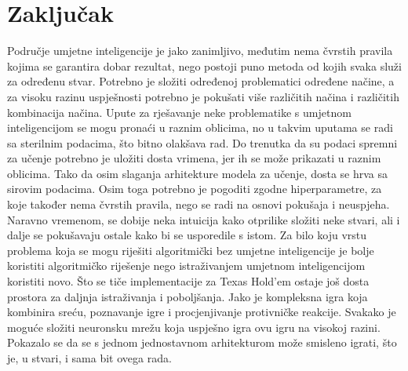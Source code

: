 \section{Zaključak}
Područje umjetne inteligencije je jako zanimljivo, međutim nema čvrstih pravila kojima se garantira dobar rezultat, nego postoji puno metoda od kojih svaka služi za određenu stvar. Potrebno je složiti određenoj problematici određene načine, a za visoku razinu uspješnosti potrebno je pokušati više različitih načina i različitih kombinacija načina. Upute za rješavanje neke problematike s umjetnom inteligencijom se mogu pronaći u raznim oblicima, no u takvim uputama se radi sa sterilnim podacima, što bitno olakšava rad. Do trenutka da su podaci spremni za učenje potrebno je uložiti dosta vrimena, jer ih se može prikazati u raznim oblicima. Tako da osim slaganja arhitekture modela za učenje, dosta se hrva sa sirovim podacima. Osim toga potrebno je pogoditi zgodne hiperparametre, za koje također nema čvrstih pravila, nego se radi na osnovi pokušaja i neuspjeha. Naravno vremenom, se dobije neka intuicija kako otprilike složiti neke stvari, ali i dalje se pokušavaju ostale kako bi se usporedile s istom. Za bilo koju vrstu problema koja se mogu riješiti algoritmički bez umjetne inteligencije je bolje koristiti algoritmičko riješenje nego istraživanjem umjetnom inteligencijom koristiti novo. Što se tiče implementacije za Texas Hold'em ostaje još dosta prostora za daljnja istraživanja i poboljšanja. Jako je kompleksna igra koja kombinira sreću, poznavanje igre i procjenjivanje protivničke reakcije. Svakako je moguće složiti neuronsku mrežu koja uspješno igra ovu igru na visokoj razini. Pokazalo se da se s jednom jednostavnom arhitekturom može smisleno igrati, što je, u stvari, i sama bit ovega rada.